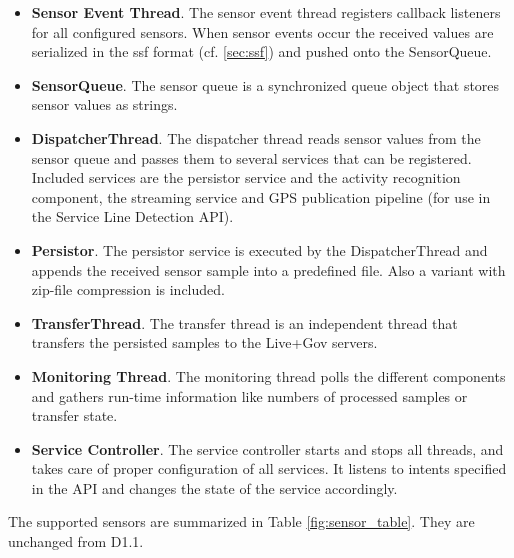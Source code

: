 \begin{itemize}
\item {\bf Sensor Event Thread}. The sensor event thread registers
  callback listeners for all configured sensors. When sensor events
  occur the received values are serialized in the ssf
  format (cf. \ref{sec:ssf}) and pushed onto the SensorQueue.
\item {\bf SensorQueue}. The sensor queue is a synchronized queue
  object that stores sensor values as strings.
\item {\bf DispatcherThread}. The dispatcher thread reads sensor
  values from the sensor queue and passes them to several services
  that can be registered. Included services are the persistor service
  and the activity recognition component, the streaming service and GPS
  publication pipeline (for use in the Service Line Detection API).
\item {\bf Persistor}. The persistor service is executed by the
  DispatcherThread and appends the received sensor sample into a
  predefined file. Also a variant with zip-file compression is
  included.
\item {\bf TransferThread}. The transfer thread is an independent
  thread that transfers the persisted samples to the Live+Gov servers.
\item {\bf Monitoring Thread}. The monitoring thread polls the
  different components and gathers run-time information like numbers
  of processed samples or transfer state.
\item {\bf Service Controller}. The service controller starts and
  stops all threads, and takes care of proper configuration of all
  services. It listens to intents specified in the API and changes the
  state of the service accordingly.
\end{itemize}

The supported sensors are summarized in Table
\ref{fig:sensor_table}. They are unchanged from D1.1.

